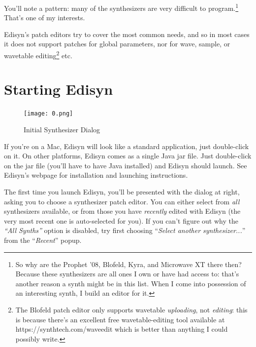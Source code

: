 \documentclass{article}
\newcommand\bump{\vspace{12in}}
\begin{document}
You'll note a pattern: many of the synthesizers are very difficult to program.\footnote{So why are the Prophet '08, Blofeld, Kyra, and Microwave XT there then?  Because these synthesizers are all ones I own or have had access to: that's another reason a synth might be in this list.  When I come into possession of an interesting synth, I build an editor for it.}  That's one of my interests.  

Edisyn's patch editors try to cover the most common needs, and so in most cases it does not support patches for global parameters, nor for wave, sample, or wavetable editing\footnote{The Blofeld patch editor only supports wavetable {\it uploading}, not {\it editing}: this is because there's an excellent free wavetable-editing tool available at https:/\!/synthtech.com/waveedit which is better than anything I could possibly write.} etc.  


\bump

\section{Starting Edisyn}
\label{startingedisyn}

\begin{figure}
\vspace{-2em}\texttt{[image: 0.png]}
\vspace{-3em}\caption{Initial Synthesizer Dialog}\label{initialsynthpanel}
\end{figure}

If you're on a Mac, Edisyn will look like a standard application, just double-click on it.  On other platforms, Edisyn comes as a single Java jar file.  Just double-click on the jar file (you'll have to have Java installed) and Edisyn should launch.  See Edisyn's webpage for installation and launching instructions.

The first time you launch Edisyn, you'll be presented with the dialog at right, asking you to choose a synthesizer patch editor.  You can either select from {\it all} synthesizers available, or from those you have {\it recently} edited with Edisyn (the very most recent one is auto-selected for you). If you can't figure out why the {\it ``All Synths''} option is disabled, try first choosing ``{\it Select another synthesizer...}'' from the ``{\it Recent}'' popup.  
\end{document}
